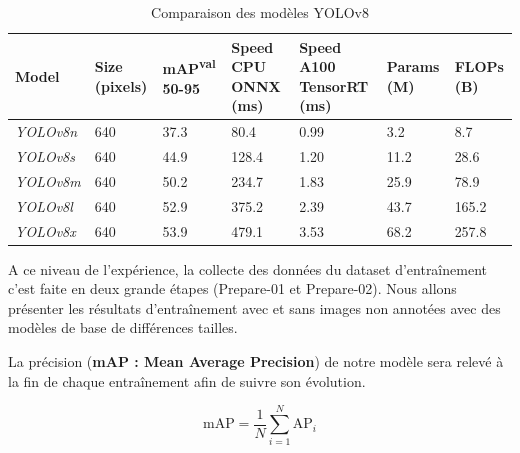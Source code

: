 \begin{table}[H]
	\centering
	\begin{tabular}{|p{2cm}|p{2cm}|p{1.7cm}|p{2.4cm}|p{2.4cm}|p{1.7cm}|p{1.7cm}|}
		\hline
		\textbf{Model}   & \textbf{Size (pixels)} & \textbf{mAP\textsuperscript{val} 50-95} & \textbf{Speed CPU ONNX (ms)} & \textbf{Speed A100 TensorRT (ms)} & \textbf{Params (M)} & \textbf{FLOPs (B)} \\ \hline
		\textit{YOLOv8n} & 640                    & 37.3                                    & 80.4                         & 0.99                              & 3.2                 & 8.7                \\ \hline
		\textit{YOLOv8s} & 640                    & 44.9                                    & 128.4                        & 1.20                              & 11.2                & 28.6               \\ \hline
		\textit{YOLOv8m} & 640                    & 50.2                                    & 234.7                        & 1.83                              & 25.9                & 78.9               \\ \hline
		\textit{YOLOv8l} & 640                    & 52.9                                    & 375.2                        & 2.39                              & 43.7                & 165.2              \\ \hline
		\textit{YOLOv8x} & 640                    & 53.9                                    & 479.1                        & 3.53                              & 68.2                & 257.8              \\ \hline
	\end{tabular}
	\caption{Comparaison des modèles YOLOv8}
	\label{tab:yolov8_comparaison}
\end{table}

A ce niveau de l'expérience, la collecte des données du dataset d'entraînement c'est faite en deux grande étapes (Prepare-01 et Prepare-02).
Nous allons présenter les résultats d'entraînement avec et sans images non annotées avec des modèles de base de différences tailles.

La précision (\textbf{mAP : Mean Average Precision}) de notre modèle sera relevé à la fin de chaque entraînement afin de suivre son évolution.

\begin{equation}
	\text{mAP} = \frac{1}{N} \sum_{i=1}^{N} \text{AP}_i
\end{equation}

